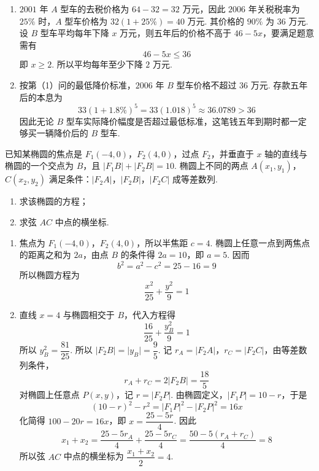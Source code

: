 \begin{solution}
\begin{enumerate}
\item \(2001\) 年 \(A\) 型车的去税价格为 \(64-32=32\) 万元，因此 \(2006\) 年关税税率为 \(25\%\) 时，\(A\) 型车价格为 \(32\left(1+25\%\right)=40\) 万元. 其价格的 \(90\%\) 为 \(36\) 万元. 设 \(B\) 型车平均每年下降 \(x\) 万元，则五年后的价格不高于 \(46-5x\)，要满足题意需有
\[
46-5x\leqslant36
\]
即 \(x\geqslant2\). 所以平均每年至少下降 \(2\) 万元.

\item 按第（1）问的最低降价标准，\(2006\) 年 \(B\) 型车价格不超过 \(36\) 万元. 存款五年后的本息为
\[
33\left(1+1.8\%\right)^{5}=33\left(1.018\right)^{5}\approx36.0789>36
\]
因此无论 \(B\) 型车实际降价幅度是否超过最低标准，这笔钱五年到期时都一定够买一辆降价后的 \(B\) 型车.
\end{enumerate}
\end{solution}

\begin{problem}
已知某椭圆的焦点是 \(F_{1}(-4,0)\)，\(F_{2}(4,0)\)，过点 \(F_{2}\)，并垂直于 \(x\) 轴的直线与椭圆的一个交点为 \(B\)，且 \(\lvert F_{1}B\rvert+\lvert F_{2}B\rvert=10\). 椭圆上不同的两点 \(A(x_{1},y_{1})\)，\(C(x_{2},y_{2})\) 满足条件：\(\lvert F_{2}A\rvert\)，\(\lvert F_{2}B\rvert\)，\(\lvert F_{2}C\rvert\) 成等差数列.

\begin{enumerate}
\item 求该椭圆的方程；
\item 求弦 \(AC\) 中点的横坐标.
\end{enumerate}
\end{problem}

\begin{solution}
\begin{enumerate}
\item 焦点为 \(F_{1}(-4,0)\)，\(F_{2}(4,0)\)，所以半焦距 \(c=4\). 椭圆上任意一点到两焦点的距离之和为 \(2a\)，由点 \(B\) 的条件得 \(2a=10\)，即 \(a=5\). 因而
\[
b^{2}=a^{2}-c^{2}=25-16=9
\]
所以椭圆方程为
\[
\dfrac{x^{2}}{25}+\dfrac{y^{2}}{9}=1
\]

\item 直线 \(x=4\) 与椭圆相交于 \(B\)，代入方程得
\[
\dfrac{16}{25}+\dfrac{y_{B}^{2}}{9}=1
\]
所以 \(y_{B}^{2}=\dfrac{81}{25}\).
所以 \(\lvert F_{2}B\rvert=\lvert y_{B}\rvert=\dfrac{9}{5}\). 记 \(r_{A}=\lvert F_{2}A\rvert\)，\(r_{C}=\lvert F_{2}C\rvert\)，由等差数列条件，
\[
r_{A}+r_{C}=2\lvert F_{2}B\rvert=\dfrac{18}{5}
\]
对椭圆上任意点 \(P(x,y)\)，记 \(r=\lvert F_{2}P\rvert\). 由椭圆定义，\(\lvert F_{1}P\rvert=10-r\)，于是
\[
\left(10-r\right)^{2}-r^{2}=\lvert F_{1}P\rvert^{2}-\lvert F_{2}P\rvert^{2}=16x
\]
化简得 \(100-20r=16x\)，即 \(x=\dfrac{25-5r}{4}\). 因此
\[
x_{1}+x_{2}=\dfrac{25-5r_{A}}{4}+\dfrac{25-5r_{C}}{4}=\dfrac{50-5\left(r_{A}+r_{C}\right)}{4}=8
\]
所以弦 \(AC\) 中点的横坐标为 \(\dfrac{x_{1}+x_{2}}{2}=4\).
\end{enumerate}
\end{solution}

